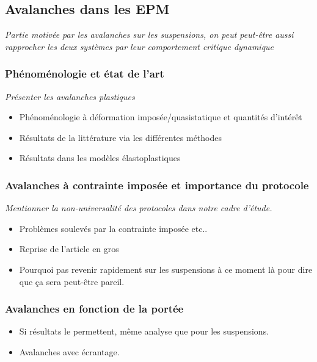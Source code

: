 \documentclass[10pt,a4paper]{article}
\begin{document}
\subsection{Avalanches dans les EPM}

\textit{Partie motivée par les avalanches sur les suspensions, on peut peut-être aussi rapprocher les deux systèmes par leur comportement critique dynamique}

\subsubsection{Phénoménologie et état de l'art}

\textit{Présenter les avalanches plastiques}

\begin{itemize}
	\item Phénoménologie à déformation imposée/quasistatique et quantités d'intérêt
	\item Résultats de la littérature via les différentes méthodes
	\item Résultats dans les modèles élastoplastiques
\end{itemize}

\subsubsection{Avalanches à contrainte imposée et importance du protocole}

\textit{Mentionner la non-universalité des protocoles dans notre cadre d'étude.}

\begin{itemize}
	\item Problèmes soulevés par la contrainte imposée etc..
	\item Reprise de l'article en gros
	\item Pourquoi pas revenir rapidement sur les suspensions à ce moment là pour dire que ça sera peut-être pareil.
\end{itemize}

\subsubsection{Avalanches en fonction de la portée}

\begin{itemize}
	\item Si résultats le permettent, même analyse que pour les suspensions.
	\item Avalanches avec écrantage.
\end{itemize}
\end{document}
